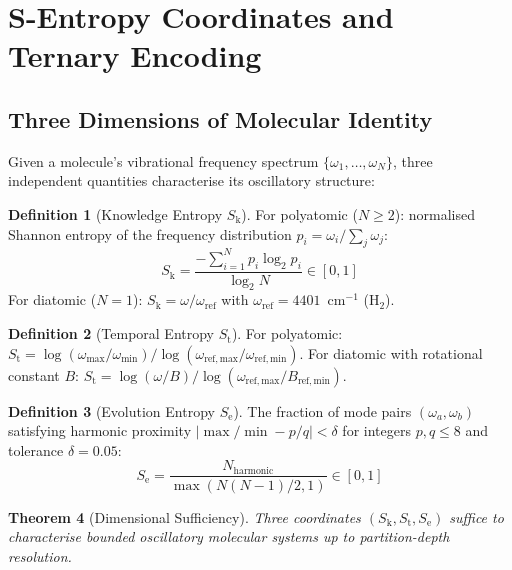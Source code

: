 \documentclass[11pt,twocolumn,a4paper]{article}
\newtheorem{theorem}{Theorem}[section]
\theoremstyle{definition}
\newtheorem{definition}[theorem]{Definition}
\theoremstyle{remark}
\newcommand{\Sk}{S_{\mathrm{k}}}
\newcommand{\St}{S_{\mathrm{t}}}
\newcommand{\Se}{S_{\mathrm{e}}}
\begin{document}
\section{S-Entropy Coordinates and Ternary Encoding}
\label{sec:sentropy}

\subsection{Three Dimensions of Molecular Identity}

Given a molecule's vibrational frequency spectrum $\{\omega_1, \ldots, \omega_N\}$, three independent quantities characterise its oscillatory structure:

\begin{definition}[Knowledge Entropy $\Sk$]
For polyatomic ($N \geq 2$): normalised Shannon entropy of the frequency distribution $p_i = \omega_i / \sum_j \omega_j$:
\begin{equation}
\Sk = \frac{-\sum_{i=1}^{N} p_i \log_2 p_i}{\log_2 N} \in [0,1]
\end{equation}
For diatomic ($N = 1$): $\Sk = \omega / \omega_{\mathrm{ref}}$ with $\omega_{\mathrm{ref}} = 4401$~cm$^{-1}$ (H$_2$).
\end{definition}

\begin{definition}[Temporal Entropy $\St$]
For polyatomic: $\St = \log(\omega_{\max}/\omega_{\min}) / \log(\omega_{\mathrm{ref,max}}/\omega_{\mathrm{ref,min}})$. For diatomic with rotational constant $B$: $\St = \log(\omega/B) / \log(\omega_{\mathrm{ref,max}}/B_{\mathrm{ref,min}})$.
\end{definition}

\begin{definition}[Evolution Entropy $\Se$]
The fraction of mode pairs $(\omega_a, \omega_b)$ satisfying harmonic proximity $|\max/\min - p/q| < \delta$ for integers $p, q \leq 8$ and tolerance $\delta = 0.05$:
\begin{equation}
\Se = \frac{N_{\mathrm{harmonic}}}{\max(N(N-1)/2, 1)} \in [0,1]
\end{equation}
\end{definition}

\begin{theorem}[Dimensional Sufficiency]
\label{thm:sufficient}
Three coordinates $(\Sk, \St, \Se)$ suffice to characterise bounded oscillatory molecular systems up to partition-depth resolution.
\end{theorem}
\end{document}
